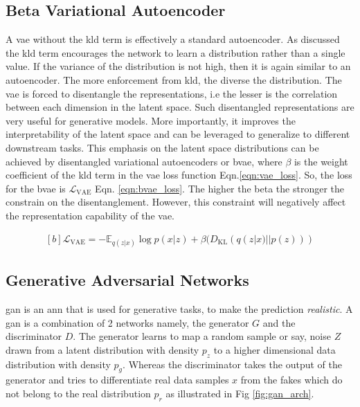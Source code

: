 \subsection{Beta Variational Autoencoder}
\label{subsec:bvae}
A \ac{vae} without the \ac{kld} term is effectively a standard autoencoder. As discussed the \ac{kld} term encourages the network to learn a distribution rather than a single value. If the variance of the distribution is not high, then it is again similar to an autoencoder. The more enforcement from \ac{kld}, the diverse the distribution. The \ac{vae} is forced to disentangle the representations, i.e the lesser is the correlation between each dimension in the latent space. Such disentangled representations are very useful for generative models. More importantly, it improves the interpretability of the latent space and can be leveraged to generalize to different downstream tasks. This emphasis on the latent space distributions can be achieved by disentangled variational autoencoders or \ac{bvae}, where $\beta$ is the weight coefficient of the \ac{kld} term in the \ac{vae} loss function Eqn.\ref{eqn:vae_loss}. So, the loss for the \ac{bvae} is $\mathcal{L}_{\mathrm{VAE}}$ Eqn. \ref{eqn:bvae_loss}. The higher the beta the stronger the constrain on the disentanglement. However, this constraint will negatively affect the representation capability of the \ac{vae}.

\begin{equation} \label{eqn:bvae_loss}
    \begin{gathered}[b]
        \mathcal{L}_{\mathrm{VAE}}=-\mathbb{E}_{q(z | x)} \log p(x | z) + \beta (D_{\mathrm{KL}}(q(z | x) || p(z)))
    \end{gathered}
\end{equation}

\subsection{Generative Adversarial Networks}
\label{subsec:gan}
\ac{gan} is an \ac{ann} that is used for generative tasks, to make the prediction \textit{realistic}. A \ac{gan} is a combination of 2 networks namely, the generator $G$ and the discriminator $D$. The generator learns to map a random sample or say, noise $Z$ drawn from a latent distribution with density $p_{z}$ to a higher dimensional data distribution with density $p_{g}$. Whereas the discriminator takes the output of the generator and tries to differentiate real data samples $x$ from the fakes which do not belong to the real distribution $p_{r}$  as illustrated in Fig \ref{fig:gan_arch}.

